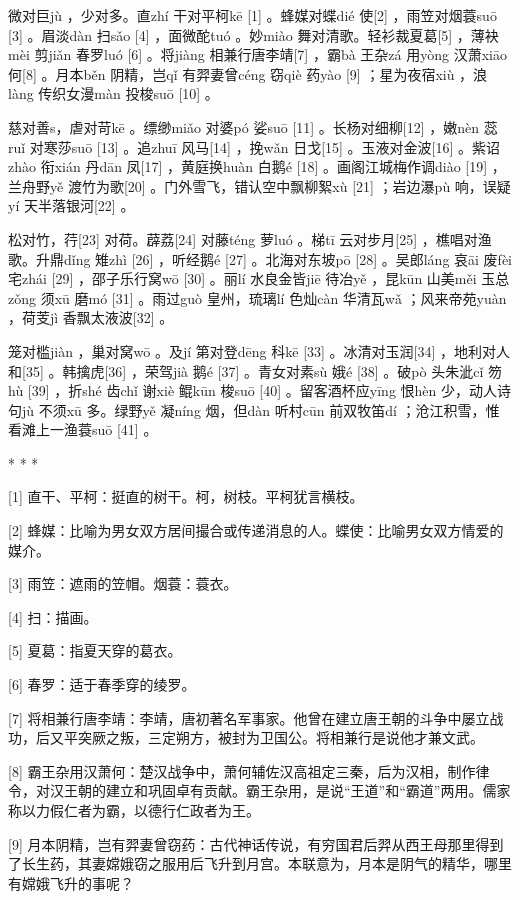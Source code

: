 \documentclass[12pt,UTF8]{ctexbook}
\begin{document}
微对巨jù ，少对多。直zhí 干对平柯kē [1] 。蜂媒对蝶dié 使[2] ，雨笠对烟蓑suō [3] 。眉淡dàn 扫sǎo [4] ，面微酡tuó 。妙miào 舞对清歌。轻衫裁夏葛[5] ，薄袂mèi 剪jiǎn 春罗luó [6] 。将jiàng 相兼行唐李靖[7] ，霸bà 王杂zá 用yòng 汉萧xiāo 何[8] 。月本běn 阴精，岂qǐ 有羿妻曾céng 窃qiè 药yào [9] ；星为夜宿xiù ，浪làng 传织女漫màn 投梭suō [10] 。

慈对善s，虐对苛kē 。缥缈miǎo 对婆pó 娑suō [11] 。长杨对细柳[12] ，嫩nèn 蕊ruǐ 对寒莎suō [13] 。追zhuī 风马[14] ，挽wǎn 日戈[15] 。玉液对金波[16] 。紫诏zhào 衔xián 丹dān 凤[17] ，黄庭换huàn 白鹅é [18] 。画阁江城梅作调diào [19] ，兰舟野yě 渡竹为歌[20] 。门外雪飞，错认空中飘柳絮xù [21] ；岩边瀑pù 响，误疑yí 天半落银河[22] 。

松对竹，荇[23] 对荷。薜荔[24] 对藤téng 萝luó 。梯tī 云对步月[25] ，樵唱对渔歌。升鼎dǐng 雉zhì [26] ，听经鹅é [27] 。北海对东坡pō [28] 。吴郎láng 哀āi 废fèi 宅zhái [29] ，邵子乐行窝wō [30] 。丽lí 水良金皆jiē 待冶yě ，昆kūn 山美měi 玉总zǒng 须xū 磨mó [31] 。雨过guò 皇州，琉璃lí 色灿càn 华清瓦wǎ ；风来帝苑yuàn ，荷芰jì 香飘太液波[32] 。

笼对槛jiàn ，巢对窝wō 。及jí 第对登dēng 科kē [33] 。冰清对玉润[34] ，地利对人和[35] 。韩擒虎[36] ，荣驾jià 鹅é [37] 。青女对素sù 娥é [38] 。破pò 头朱泚cǐ 笏hù [39] ，折shé 齿chǐ 谢xiè 鲲kūn 梭suō [40] 。留客酒杯应yīng 恨hèn 少，动人诗句jù 不须xū 多。绿野yě 凝níng 烟，但dàn 听村cūn 前双牧笛dí ；沧江积雪，惟看滩上一渔蓑suō [41] 。



* * *



[1] 直干、平柯：挺直的树干。柯，树枝。平柯犹言横枝。

[2] 蜂媒：比喻为男女双方居间撮合或传递消息的人。蝶使：比喻男女双方情爱的媒介。

[3] 雨笠：遮雨的笠帽。烟蓑：蓑衣。

[4] 扫：描画。

[5] 夏葛：指夏天穿的葛衣。

[6] 春罗：适于春季穿的绫罗。

[7] 将相兼行唐李靖：李靖，唐初著名军事家。他曾在建立唐王朝的斗争中屡立战功，后又平突厥之叛，三定朔方，被封为卫国公。将相兼行是说他才兼文武。

[8] 霸王杂用汉萧何：楚汉战争中，萧何辅佐汉高祖定三秦，后为汉相，制作律令，对汉王朝的建立和巩固卓有贡献。霸王杂用，是说“王道”和“霸道”两用。儒家称以力假仁者为霸，以德行仁政者为王。

[9] 月本阴精，岂有羿妻曾窃药：古代神话传说，有穷国君后羿从西王母那里得到了长生药，其妻嫦娥窃之服用后飞升到月宫。本联意为，月本是阴气的精华，哪里有嫦娥飞升的事呢？
\end{document}

